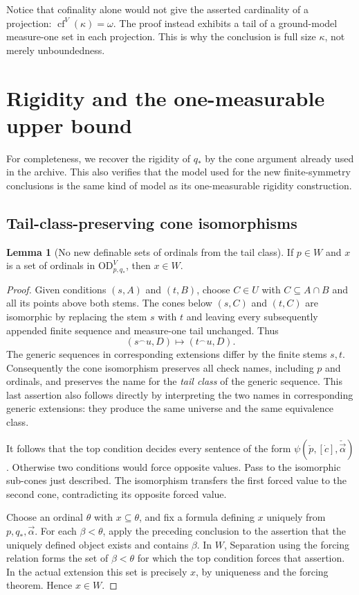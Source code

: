 \documentclass[11pt,letterpaper]{article}
\theoremstyle{definition}
\newtheorem{lemma}[definition]{Lemma}
\numberwithin{equation}{section}
\newcommand{\OD}{\mathrm{OD}}
\newcommand{\cf}{\operatorname{cf}}
\begin{document}
Notice that cofinality alone would not give the asserted cardinality of a
projection: $\cf^V(\kappa)=\omega$. The proof instead exhibits a tail of a
ground-model measure-one set in each projection. This is why the conclusion
is full size $\kappa$, not merely unboundedness.

\section{Rigidity and the one-measurable upper bound}\label{sec:consistency}

For completeness, we recover the rigidity of $q_*$ by the cone argument
already used in the archive. This also verifies that the model used for
the new finite-symmetry conclusions is the same kind of model as its
one-measurable rigidity construction.

\subsection{Tail-class-preserving cone isomorphisms}

\begin{lemma}[No new definable sets of ordinals from the tail class]
\label{lem:groundordinals}
If $p\in W$ and $x$ is a set of ordinals in $\OD_{p,q_*}^V$, then $x\in W$.
\end{lemma}

\begin{proof}
Given conditions $(s,A)$ and $(t,B)$, choose
$C\in U$ with $C\subseteq A\cap B$ and all its points above both stems.
The cones below $(s,C)$ and $(t,C)$ are isomorphic by replacing the stem
$s$ with $t$ and leaving every subsequently appended finite sequence and
measure-one tail unchanged. Thus
\[
                    (s{}^\frown u,D)\longmapsto(t{}^\frown u,D).
\]
The generic sequences in corresponding extensions differ by the finite
stems $s,t$. Consequently the cone isomorphism preserves all check names,
including $p$ and ordinals, and preserves the name for the \emph{tail class}
of the generic sequence. This last assertion also follows directly by
interpreting the two names in corresponding generic extensions: they
produce the same universe and the same equivalence class.

It follows that the top condition decides every sentence of the form
$\psi(\check p,[\dot c],\check{\vec\alpha})$. Otherwise two conditions
would force opposite values. Pass to the isomorphic sub-cones just
described. The isomorphism transfers the first forced value to the
second cone, contradicting its opposite forced value.

Choose an ordinal $\theta$ with $x\subseteq\theta$, and fix a formula
defining $x$ uniquely from $p,q_*,\vec\alpha$. For each $\beta<\theta$,
apply the preceding conclusion to the assertion that the uniquely defined
object exists and contains $\beta$. In $W$, Separation using the forcing
relation forms the set of $\beta<\theta$ for which the top condition
forces that assertion. In the actual extension this set is precisely
$x$, by uniqueness and the forcing theorem. Hence $x\in W$.
\end{proof}
\end{document}

